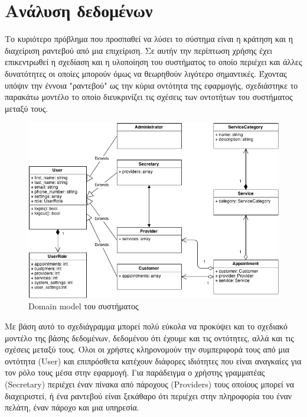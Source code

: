 \section{Ανάλυση δεδομένων}
Το κυριότερο πρόβλημα που προσπαθεί να λύσει το σύστημα είναι η κράτηση και η διαχείριση ραντεβού από μια επιχείριση. Σε αυτήν την περίπτωση χρήσης έχει επικεντρωθεί η σχεδίαση και η υλοποίηση του συστήματος το οποίο περιέχει και άλλες δυνατότητες οι οποίες μπορούν όμως να θεωρηθούν λιγότερο σημαντικές. Έχοντας υπόψιν την έννοια "ραντεβού" ως την κύρια οντότητα της εφαρμογής, σχεδιάστηκε το παρακάτω μοντέλο το οποίο διευκρινίζει τις σχέσεις των οντοτήτων του συστήματος μεταξύ τους.

\begin{figure}[ht!]
\centering
\includegraphics[width=160mm]{images/domain-model.png}
\caption{Domain model του συστήματος}
\label{domain-model}
\end{figure}

Με βάση αυτό το σχεδιάγραμμα μπορεί πολύ εύκολα να προκύψει και το σχεδιακό μοντέλο της βάσης δεδομένων, δεδομένου ότι έχουμε και τις οντότητες, αλλά και τις σχέσεις μεταξύ τους. Όλοι οι χρήστες κληρονομούν την συμπεριφορά τους από μια οντότητα (User) και επιπρόσθετα κατέχουν διάφορες ιδιότητες που είναι αναγκαίες για τον ρόλο τους μέσα στην εφαρμογή. Για παράδειγμα ο χρήστης γραμματέας (Secretary) περιέχει έναν πίνακα από πάροχους (Providers) τους οποίους μπορεί να διαχειριστεί, ή ένα ραντεβού είναι ξεκάθαρο ότι περιέχει στην πληροφορία του έναν πελάτη, έναν πάροχο και μια υπηρεσία.

